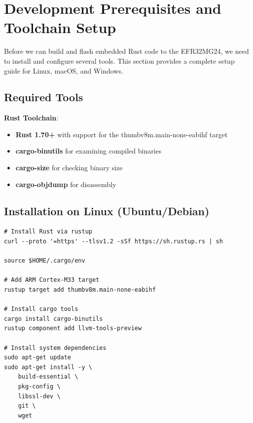 \section{Development Prerequisites and Toolchain Setup}
\label{sec:development-prerequisites}


Before we can build and flash embedded Rust code to the EFR32MG24, we need to install and configure several tools. This section provides a complete setup guide for Linux, macOS, and Windows.

\subsection{Required Tools}
\label{sec:required-tools}

\textbf{Rust Toolchain}:

\begin{itemize}
    \item \textbf{Rust 1.70+} with support for the thumbv8m.main-none-eabihf target
    \item \textbf{cargo-binutils} for examining compiled binaries
    \item \textbf{cargo-size} for checking binary size
    \item \textbf{cargo-objdump} for disassembly
\end{itemize}
\subsection{Installation on Linux (Ubuntu/Debian)}
\label{subsec:install-linux}
\begin{verbatim}
# Install Rust via rustup
curl --proto '=https' --tlsv1.2 -sSf https://sh.rustup.rs | sh

source $HOME/.cargo/env

# Add ARM Cortex-M33 target
rustup target add thumbv8m.main-none-eabihf

# Install cargo tools
cargo install cargo-binutils
rustup component add llvm-tools-preview

# Install system dependencies
sudo apt-get update
sudo apt-get install -y \
    build-essential \
    pkg-config \
    libssl-dev \
    git \
    wget
\end{verbatim}

